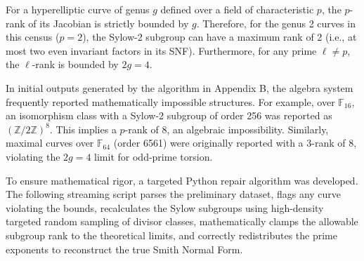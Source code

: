 \documentclass[11pt,letterpaper]{article}
\begin{document}
For a hyperelliptic curve of genus $g$ defined over a field of characteristic $p$, the $p$-rank of its Jacobian is strictly bounded by $g$. Therefore, for the genus 2 curves in this census ($p=2$), the Sylow-2 subgroup can have a maximum rank of 2 (i.e., at most two even invariant factors in its SNF). Furthermore, for any prime $\ell \neq p$, the $\ell$-rank is bounded by $2g = 4$. 

In initial outputs generated by the algorithm in Appendix B, the algebra system frequently reported mathematically impossible structures. For example, over $\mathbb{F}_{16}$, an isomorphism class with a Sylow-2 subgroup of order 256 was reported as $(\mathbb{Z}/2\mathbb{Z})^8$. This implies a $p$-rank of 8, an algebraic impossibility. Similarly, maximal curves over $\mathbb{F}_{64}$ (order 6561) were originally reported with a 3-rank of 8, violating the $2g=4$ limit for odd-prime torsion. 

To ensure mathematical rigor, a targeted Python repair algorithm was developed. The following streaming script parses the preliminary dataset, flags any curve violating the bounds, recalculates the Sylow subgroups using high-density targeted random sampling of divisor classes, mathematically clamps the allowable subgroup rank to the theoretical limits, and correctly redistributes the prime exponents to reconstruct the true Smith Normal Form.
\end{document}

